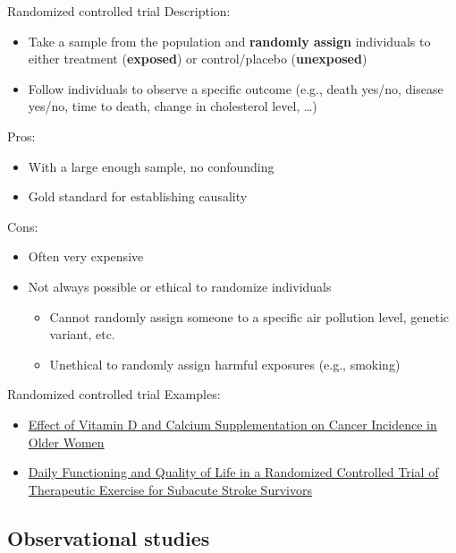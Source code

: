 \documentclass[10pt,t]{beamer}
\begin{document}
\begin{frame}{Randomized controlled trial}
Description:
\begin{itemize}
	\item Take a sample from the population and \textbf{randomly assign} individuals to either treatment (\textbf{exposed}) or control/placebo (\textbf{unexposed})
	\item Follow individuals to observe a specific outcome (e.g., death yes/no, disease yes/no, time to death, change in cholesterol level, \dots)
\end{itemize}
Pros:
\begin{itemize}
	\item With a large enough sample, no confounding
	\item Gold standard for establishing causality
\end{itemize}
Cons:
\begin{itemize}
	\item Often very expensive
	\item Not always possible or ethical to randomize individuals
	\begin{itemize}
		\item Cannot randomly assign someone to a specific air pollution level, genetic variant, etc.
		\item Unethical to randomly assign harmful exposures (e.g., smoking)
	\end{itemize}
\end{itemize}
\end{frame}

\begin{frame}[c]{Randomized controlled trial}
Examples: 

\vspace{0.3cm}

\begin{itemize}
	\item \href{https://jamanetwork.com/journals/jama/article-abstract/2613159}{\color{cyan} Effect of Vitamin D and Calcium Supplementation on Cancer Incidence in Older Women}
	\item \href{http://stroke.ahajournals.org/content/36/8/1764.short}{\color{cyan} Daily Functioning and Quality of Life in a Randomized Controlled Trial of Therapeutic Exercise for Subacute Stroke Survivors}
\end{itemize}

\end{frame}


\subsection{Observational studies}
\end{document}
